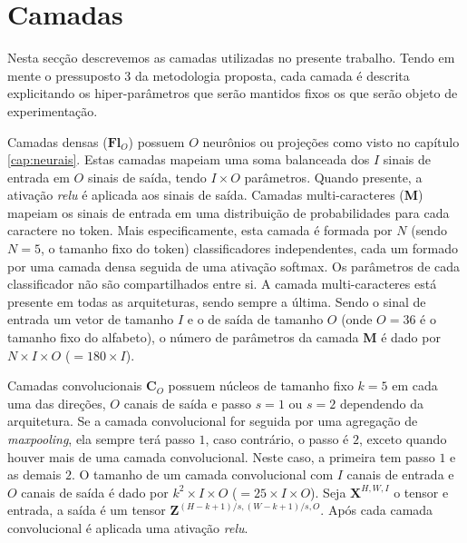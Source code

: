 \section{Camadas}\label{sec:camadas}

Nesta secção descrevemos as camadas utilizadas no presente trabalho. Tendo em mente o pressuposto 3 da metodologia proposta, cada camada é descrita explicitando os hiper-parâmetros que serão mantidos fixos os que serão objeto de experimentação.

Camadas densas ($\mathbf{Fl}_{O}$) possuem $O$ neurônios ou projeções como visto no capítulo \ref{cap:neurais}. Estas camadas mapeiam uma soma balanceada dos $I$ sinais de entrada em $O$ sinais de saída, tendo $I \times O$ parâmetros. Quando presente, a ativação \textit{relu} é aplicada aos sinais de saída. Camadas multi-caracteres (\textbf{M}) mapeiam os sinais de entrada em uma distribuição de probabilidades para cada caractere no token. Mais especificamente, esta camada é formada por $N$ (sendo $N=5$, o tamanho fixo do token) classificadores independentes, cada um formado por uma camada densa seguida de uma ativação softmax. Os parâmetros de cada classificador não são compartilhados entre si. A camada multi-caracteres está presente em todas as arquiteturas, sendo sempre a última. Sendo o sinal de entrada um vetor de tamanho $I$ e o de saída de tamanho $O$ (onde $O=36$ é o tamanho fixo do alfabeto), o número de parâmetros da camada \textbf{M} é dado por $N \times I \times O$ ($ = 180 \times I$). 

Camadas convolucionais $\mathbf{C}_{O}$ possuem núcleos de tamanho fixo $k=5$ em cada uma das direções, $O$ canais de saída e passo $s=1$ ou $s=2$ dependendo da arquitetura. Se a camada convolucional for seguida por uma agregação de \textit{maxpooling}, ela sempre terá passo $1$, caso contrário, o passo é $2$, exceto quando houver mais de uma camada convolucional. Neste caso, a primeira tem passo $1$ e as demais $2$. O tamanho de um camada convolucional com $I$ canais de entrada e $O$ canais de saída é dado por $k^2 \times I \times O$ ($= 25 \times I \times O$). Seja $\mathbf{X}^{H, W, I}$ o tensor e entrada, a saída é um tensor $\mathbf{Z}^{\left(H - k + 1\right)/s, \left(W - k + 1\right)/s, O}$. Após cada camada convolucional é aplicada uma ativação \textit{relu}.


